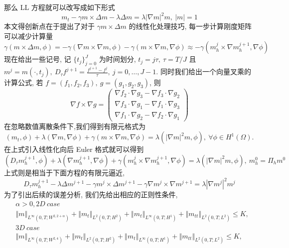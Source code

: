 \documentclass[UTF8,a4paper]{article}
\begin{document}
那么 LL 方程就可以改写成如下形式
\begin{equation*}
m_t-\gamma m\times \Delta m-\lambda\Delta m=\lambda \left| \nabla m \right|^2m,\ \left| m \right|=1
\end{equation*}
本文得创新点在于提出了对于 $\gamma m\times\Delta m$ 的线性化处理技巧, 每一步计算刚度矩阵可以减少计算量
\begin{equation*}
\gamma(m\times \Delta m,\phi)=-\gamma(\nabla m\times\nabla m,\phi)-\gamma(m\times\nabla m,\nabla\phi)\approx-\gamma(m_h^j\times \nabla m_h^{j+1},\nabla\phi)
\end{equation*}
现在给出一些记号, 记 $\{t_j\}_{j=0}^J$ 为时间划分, $t_j=j\tau,\ \tau=T/J$ 且 $m^j=m(\cdot,t_j),\ D_{\tau}f^{j+1}=\frac{f^{j+1}-f^j}{\tau},\ j=0,\dots,J-1$. 同时我们给出一个向量叉乘的计算公式, 若 $f=(f_1,f_2,f_3),\ g=(g_1,g_2,g_3)$, 则
\begin{equation*}
\nabla f\times\nabla g=
\begin{pmatrix}
  \nabla f_2\cdot\nabla g_3-\nabla f_3\cdot\nabla g_2\\
  \nabla f_3\cdot\nabla g_1-\nabla f_1\cdot\nabla g_3\\
  \nabla f_1\cdot\nabla g_2-\nabla f_2\cdot\nabla g_{1}
\end{pmatrix}
\end{equation*}
在忽略数值离散条件下,我们得到有限元格式为
\begin{equation*}
(m_t,\phi)+\lambda(\nabla m,\nabla\phi)+\gamma(m\times\nabla m,\nabla\phi)=\lambda(\left| \nabla m \right|^2m,\phi),\ \forall\phi\in H^1(\Omega).
\end{equation*}
在上式引入线性化向后 Euler 格式就可以得到
\begin{equation*}
(D_{\tau}m_h^{j+1},\phi)+\lambda(\nabla m_h^{j+1},\nabla\phi)+\gamma(m_h^j\times\nabla m_h^{j+1},\nabla\phi)=\lambda(\left| \nabla m \right|^2m,\phi),\ m_h^0=\Pi_hm^{0}
\end{equation*}
上式则是相当于下面方程的有限元逼近,
\begin{equation*}
D_{\tau}m_h^{j+1}-\lambda\Delta m^{j+1}-\gamma m^j\times\Delta m^{j+1}-\gamma \nabla m^j\times\nabla m^{j+1}=\lambda \left| \nabla m^j \right|^2m^j
\end{equation*}
为了引出后续的误差分析, 我们先给出相应的正则性条件,
\begin{align*}
&\alpha>0,2D\ case\\
  &\left\Vert m\right\Vert_{L^{\infty}(0,T;W^{2,2+\alpha})}+\left\Vert m_t\right\Vert_{L^2(0,T;H^2)}+\left\Vert m_t\right\Vert_{L^{\infty}(0,T;H^1)}+\left\Vert m_{tt}\right\Vert_{L^2(0,T;L^2)}\leq K,\\
&3D\ case\\
  &\left\Vert m\right\Vert_{L^{\infty}(0,T;W^{2,4})}+\left\Vert m_t\right\Vert_{L^2(0,T;H^2)}+\left\Vert m_t\right\Vert_{L^{\infty}(0,T;H^1)}+\left\Vert m_{tt}\right\Vert_{L^2(0,T;L^2)}\leq K,\\
\end{align*}
\end{document}
